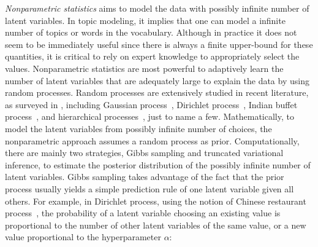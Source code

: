 \emph{Nonparametric statistics} aims to model the data with possibly infinite
number of latent variables. In topic modeling, it implies that one can model a
infinite number of topics or words in the vocabulary. Although in practice it
does not seem to be immediately useful since there is always a finite
upper-bound for these quantities, it is critical to rely on expert knowledge to
appropriately select the values. Nonparametric statistics are most powerful to
adaptively learn the number of latent variables that are adequately large to
explain the data by using random processes. Random processes are extensively
studied in recent literature, as surveyed in \cite{hajek2015random}, including
Gaussian process~\cite{rasmussen2006gaussian}, Dirichlet
process~\cite{teh2011dirichlet}, Indian buffet
process~\cite{ghahramani2005infinite}, and hierarchical
processes~\cite{teh2012hierarchical,griffiths2004hierarchical,blei2010nested},
just to name a few. Mathematically, to model the latent variables from possibly
infinite number of choices, the nonparametric approach assumes a random process
as prior. Computationally, there are mainly two strategies, Gibbs sampling and
truncated variational inference, to estimate the posterior distribution of the
possibly infinite number of latent variables. Gibbs sampling takes advantage of
the fact that the prior process usually yields a simple prediction rule of one
latent variable given all others. For example, in Dirichlet process, using the
notion of Chinese restaurant process~\cite{pitman2002combinatorial}, the
probability of a latent variable choosing an existing value is proportional to
the number of other latent variables of the same value, or a new value
proportional to the hyperparameter $\alpha$:

